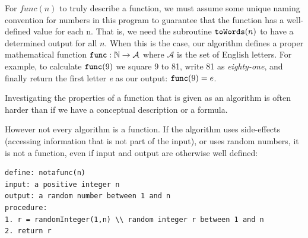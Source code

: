 For $func(n)$ to truly describe a function, we must assume some unique naming
convention for numbers in this program to guarantee that the function has a
well-defined value for each n.  That is, we need the subroutine
$\mbox{\texttt{toWords}}(n)$
to have a determined output for all $n$. When this is the case, our algorithm
defines a proper mathematical function $\mbox{\texttt{func}}: \mathbb{N} \rightarrow
\mathcal{A}$ where $\mathcal{A}$ is the set of English letters. For example,
to calculate $\mbox{\texttt{func}}(9)$ we square 9 to 81, write 81 as \textit{eighty-one},
and finally return the first letter \textit{e} as our output:
$\mbox{\texttt{func}}(9)=e$.

Investigating the properties of a function that is given as an algorithm is
often harder than if we have a conceptual description or a formula.
\smallskip

%

However not every algorithm is a function. If the algorithm uses side-effects
(accessing information that is not part of the input), or uses random
numbers, it is not a function, even if input and output are otherwise well
defined:

\begin{verbatim}
define: notafunc(n)
input: a positive integer n
output: a random number between 1 and n
procedure:
1. r = randomInteger(1,n) \\ random integer r between 1 and n
2. return r
\end{verbatim}

